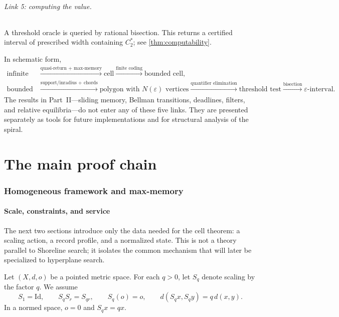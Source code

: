 \documentclass[10pt,a4paper]{article}
\theoremstyle{definition}
\theoremstyle{remark}
\newcommand{\eps}{\varepsilon}
\begin{document}
\paragraph{Link 5: computing the value.}
A threshold oracle is queried by rational bisection. This returns a certified interval of prescribed width containing $C_2^*$; see \cref{thm:computability}.

In schematic form,
\[
\begin{aligned}
\text{infinite history}
&\xrightarrow{\text{quasi-return + max-memory}}
\text{cell}
\xrightarrow{\text{finite coding}}
\text{bounded cell},\\
\text{bounded cell}
&\xrightarrow{\text{support/inradius + chords}}
\text{polygon with }N(\eps)\text{ vertices}
\xrightarrow{\text{quantifier elimination}}
\text{threshold test}
\xrightarrow{\text{bisection}}
\eps\text{-interval}.
\end{aligned}
\]
The results in Part~II---sliding memory, Bellman transitions, deadlines, filters, and relative equilibria---do not enter any of these five links. They are presented separately as tools for future implementations and for structural analysis of the spiral.

\part{The main proof chain}

\section{Homogeneous framework and max-memory}
\subsection{Scale, constraints, and service}
The next two sections introduce only the data needed for the cell theorem: a scaling action, a record profile, and a normalized state. This is not a theory parallel to Shoreline search; it isolates the common mechanism that will later be specialized to hyperplane search.

Let $(X,d,o)$ be a pointed metric space. For each $q>0$, let $S_q$ denote scaling by the factor $q$. We assume
\begin{equation}
S_1=\mathrm{Id},\qquad S_qS_r=S_{qr},\qquad S_q(o)=o,\qquad d(S_qx,S_qy)=q\,d(x,y).
\label{eq:scaling}
\end{equation}
In a normed space, $o=0$ and $S_qx=qx$.
\end{document}
